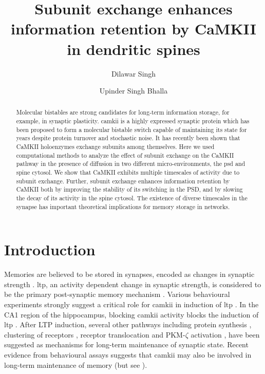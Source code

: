 \documentclass[9pt,lineno,doublespacing]{elife}
\title{Subunit exchange enhances information retention by CaMKII in dendritic spines}
\author[]{Dilawar Singh}
\author[]{Upinder Singh Bhalla}
\affil[]{National Centre for Biological Sciences Bangalore, Tata Institute of Fundamental Research}
\begin{document}
\maketitle

\begin{abstract}\label{abstract} 

Molecular bistables are strong candidates for long-term information storage, for
example, in synaptic plasticity. \Gls{camkii} is a highly expressed synaptic
protein which has been proposed to form a molecular bistable switch capable of
maintaining its state for years despite protein turnover and stochastic noise.
It has recently been shown that CaMKII holoenzymes exchange subunits among
themselves. Here we used computational methods to analyze the effect of subunit
exchange on the CaMKII pathway in the presence of diffusion in two different
micro-environments, the \gls{psd} and spine cytosol. We show that CaMKII
exhibits multiple timescales of activity due to subunit exchange. Further,
subunit exchange enhances information retention by CaMKII both by improving the
stability of its switching in the PSD, and by slowing the decay of its activity
in the spine cytosol. The existence of diverse timescales in the synapse has
important theoretical implications for memory storage in networks.

\end{abstract}

\section{Introduction}\label{introduction}

Memories are believed to be stored in synapses, encoded as changes in synaptic
strength \citep{hebb_organization_2005,takeuchi_synaptic_2014,choi_interregional_2018}.
\gls{ltp}, an activity dependent change in synaptic strength, is considered to
be the primary post-synaptic memory mechanism
\citep{bliss_expression_2013,mayford_synapses_2012}. Various behavioural
experiments strongly suggest a critical role for \gls{camkii} in induction of
\gls{ltp} \citep{lucchesi_novel_2011,giese_autophosphorylation_1998}. In
the CA1 region of the hippocampus, blocking \gls{camkii} activity blocks the
induction of \gls{ltp} \citep{chang_camkii_2017}. After LTP induction, several
other pathways including protein synthesis \citep{aslam_translational_2009},
clustering of receptors \citep{shouval_clusters_2005}, receptor translocation
\citep{hayer_molecular_2005} and PKM-$\zeta$ activation
\citep{sacktor_memory_2012}, have been suggested as mechanisms for long-term
maintenance of synaptic state. Recent evidence from behavioural assays suggests
that \gls{camkii} may also be involved in long-term maintenance of memory
\citep{rossetti_memory_2017} (but see \citep{chang_camkii_2017}).
\end{document}

